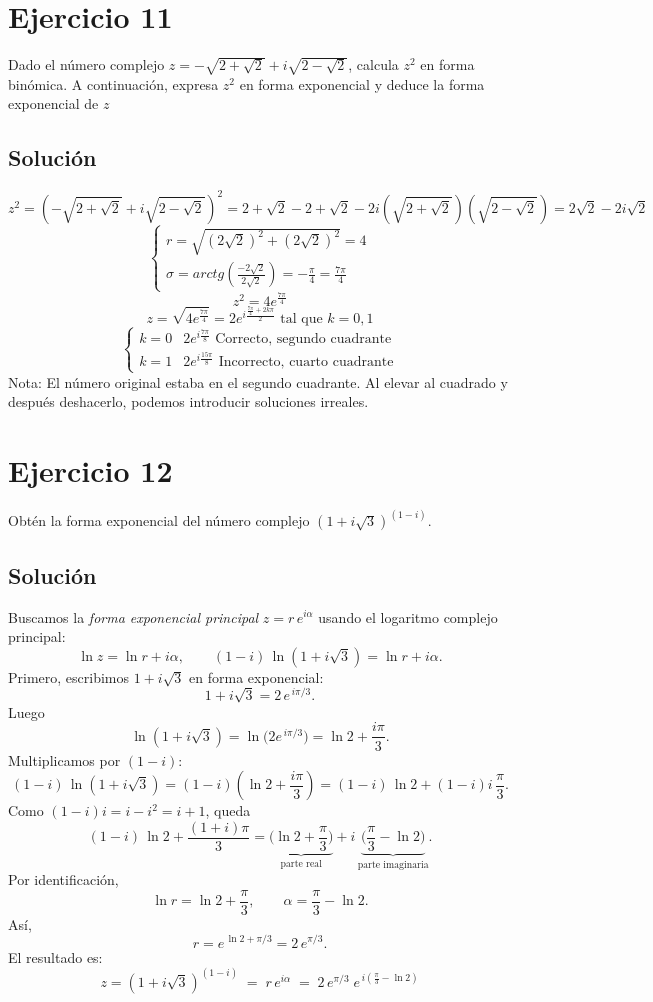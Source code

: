 \documentclass[fleqn]{article}
\begin{document}
 	\section{Ejercicio 11}
 	Dado el número complejo $z = -\sqrt{2+\sqrt{2}} + i\sqrt{2-\sqrt{2}}$, calcula $z^{2}$ en forma binómica. A continuación, expresa $z^{2}$ en forma exponencial y deduce la forma exponencial de $z$
 	\subsection{Solución}
 	 \[
 	 z^{2} = (-\sqrt{2+\sqrt{2}} + i\sqrt{2-\sqrt{2}})^{2} = 2 + \sqrt{2} - 2 + \sqrt{2} - 2i(\sqrt{2+\sqrt{2}})(\sqrt{2-\sqrt{2}}) = \boxed{2\sqrt{2} - 2i\sqrt{2}}
 	 \]
 	 \[
 	 \begin{cases}
 	 	r = \sqrt{(2\sqrt{2})^{2} + (2\sqrt{2})^{2}} = 4 \\
 	 	\sigma = arctg(\frac{-2\sqrt{2}}{2\sqrt{2}}) = -\frac{\pi}{4} = \frac{7\pi}{4}
 	 \end{cases}
 	 \]
 	 \[
 	 z^{2} = 4e^{\frac{7\pi}{4}}
 	 \]
 	 \[
 	 z = \sqrt{4e^{\frac{7\pi}{4}}} = 2e^{i\frac{\frac{7\pi}{4}+ 2k\pi}{2}} \text{ tal que } k = 0,1
 	 \]
 	 \[
 	 \begin{cases}
 	 	k = 0 & 2e^{i\frac{7\pi}{8}} \text{ Correcto, segundo cuadrante} \\
 	 	k = 1 & 2e^{i\frac{15\pi}{8}} \text{ Incorrecto, cuarto cuadrante}
 	 \end{cases}
 	 \]
 	 Nota: El número original estaba en el segundo cuadrante. Al elevar al cuadrado y después deshacerlo, podemos introducir soluciones irreales.
\section*{Ejercicio 12}
Obtén la forma exponencial del número complejo $(1+i\sqrt{3})^{(1-i)}$.

\subsection*{Solución}
Buscamos la \emph{forma exponencial principal} $z=r\,e^{i\alpha}$ usando el logaritmo complejo principal:
\[
\ln z=\ln r+i\alpha,\qquad 
(1-i)\,\ln(1+i\sqrt{3})=\ln r+i\alpha.
\]
Primero, escribimos $1+i\sqrt{3}$ en forma exponencial:
\[
1+i\sqrt{3}=2\,e^{\,i\pi/3}.
\]
Luego
\[
\ln(1+i\sqrt{3})=\ln\!\big(2e^{\,i\pi/3}\big)=\ln 2+\frac{i\pi}{3}.
\]
Multiplicamos por $(1-i)$:
\[
(1-i)\,\ln(1+i\sqrt{3})
=(1-i)\!\left(\ln 2+\frac{i\pi}{3}\right)
=(1-i)\,\ln 2+(1-i)i\,\frac{\pi}{3}.
\]
Como $(1-i)i=i-i^2=i+1$, queda
\[
(1-i)\,\ln 2+\frac{(1+i)\pi}{3}
=\underbrace{\Big(\ln 2+\frac{\pi}{3}\Big)}_{\text{parte real}}
+i\,\underbrace{\Big(\frac{\pi}{3}-\ln 2\Big)}_{\text{parte imaginaria}}.
\]
Por identificación,
\[
\ln r=\ln 2+\frac{\pi}{3},
\qquad
\alpha=\frac{\pi}{3}-\ln 2.
\]
Así,
\[
r=e^{\,\ln 2+\pi/3}=2\,e^{\pi/3}.
\]
El resultado es:
\[
\boxed{\;z=(1+i\sqrt{3})^{(1-i)} \;=\; r\,e^{i\alpha}
\;=\; 2\,e^{\pi/3}\; e^{\,i\left(\frac{\pi}{3}-\ln 2\right)}\;}
\]
\end{document}
